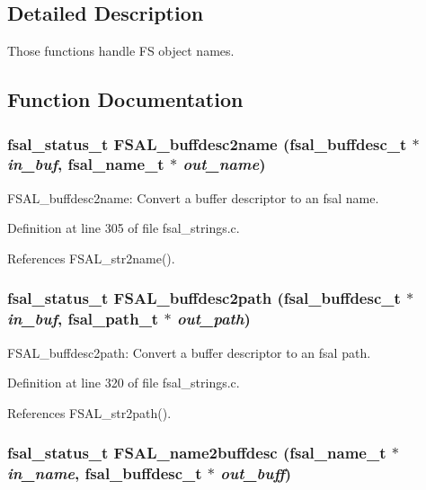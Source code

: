 \subsection{Detailed Description}
Those functions handle FS object names. 

\subsection{Function Documentation}
\subsubsection[{FSAL\_\-buffdesc2name}]{\setlength{\rightskip}{0pt plus 5cm}fsal\_\-status\_\-t FSAL\_\-buffdesc2name (fsal\_\-buffdesc\_\-t $\ast$ {\em in\_\-buf}, \/  fsal\_\-name\_\-t $\ast$ {\em out\_\-name})}\label{group__FSALNameFunctions_g46f91146c872ff335d8547f33203f3f7}


FSAL\_\-buffdesc2name: Convert a buffer descriptor to an fsal name. 

Definition at line 305 of file fsal\_\-strings.c.

References FSAL\_\-str2name().
\subsubsection[{FSAL\_\-buffdesc2path}]{\setlength{\rightskip}{0pt plus 5cm}fsal\_\-status\_\-t FSAL\_\-buffdesc2path (fsal\_\-buffdesc\_\-t $\ast$ {\em in\_\-buf}, \/  fsal\_\-path\_\-t $\ast$ {\em out\_\-path})}\label{group__FSALNameFunctions_g213919f3487ec817411a288a6e8dd66d}


FSAL\_\-buffdesc2path: Convert a buffer descriptor to an fsal path. 

Definition at line 320 of file fsal\_\-strings.c.

References FSAL\_\-str2path().
\subsubsection[{FSAL\_\-name2buffdesc}]{\setlength{\rightskip}{0pt plus 5cm}fsal\_\-status\_\-t FSAL\_\-name2buffdesc (fsal\_\-name\_\-t $\ast$ {\em in\_\-name}, \/  fsal\_\-buffdesc\_\-t $\ast$ {\em out\_\-buff})}\label{group__FSALNameFunctions_g5aee66141ed415b3f251a14698050df8}


